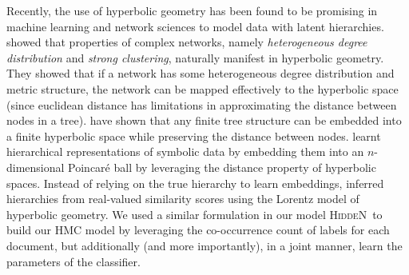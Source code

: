 \documentclass[11pt,a4paper]{article}
\newcommand{\model}{\mbox{\textsc{HiddeN}}}
\begin{document}
Recently, the use of hyperbolic geometry has been found to be promising in machine learning and network sciences to model data with latent hierarchies. \citet{complexhyperbolic} showed that properties of complex networks, namely {\em heterogeneous degree distribution} and {\em strong clustering}, naturally manifest in hyperbolic geometry. They showed that if a network has some heterogeneous degree distribution and metric structure,  the network can be mapped effectively to the hyperbolic space (since euclidean distance has limitations in approximating the distance between nodes in a tree). \citet{hyperbolic1987} have shown that any finite tree structure can be embedded into a finite hyperbolic space while preserving the distance between nodes. \citet{poincare} learnt hierarchical representations of symbolic data by embedding them into an $n$-dimensional Poincar\'e ball by leveraging the distance property of hyperbolic spaces. Instead of relying on the true hierarchy to learn embeddings, \citet{lorentz} inferred hierarchies from real-valued similarity scores using the Lorentz model of hyperbolic geometry. We used a similar formulation in our model \model\ to build our HMC model by leveraging the co-occurrence count of labels for each document, but additionally (and more importantly), in a joint manner, learn the parameters of the classifier.
\end{document}
